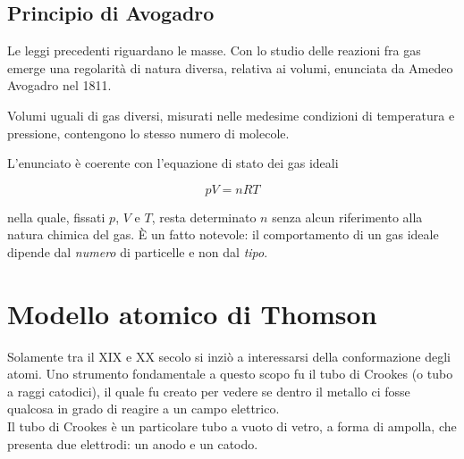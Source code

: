 \subsection{Principio di Avogadro}
 
Le leggi precedenti riguardano le masse. Con lo studio delle reazioni fra gas emerge una regolarità di natura diversa, relativa ai volumi, enunciata da Amedeo Avogadro nel 1811.
 
\begin{definizione}
    Volumi uguali di gas diversi, misurati nelle medesime condizioni di  temperatura e pressione, contengono lo stesso numero di molecole.
\end{definizione}
 
L'enunciato è coerente con l'equazione di stato dei gas ideali

\begin{equation}
    pV = nRT
    \label{eq:gasideali}
\end{equation}

nella quale, fissati $p$, $V$ e $T$, resta determinato $n$ senza alcun riferimento alla natura chimica del gas. 
È un fatto notevole: il comportamento di un gas ideale dipende dal \emph{numero} di particelle e non dal \emph{tipo}.

\newpage

\section{Modello atomico di Thomson}

Solamente tra il XIX e XX secolo si inziò a interessarsi della conformazione degli atomi. Uno strumento fondamentale a questo scopo fu il tubo di Crookes (o tubo a raggi catodici), il quale fu creato per vedere se dentro il metallo ci fosse qualcosa in grado di reagire a un campo elettrico. \\

Il tubo di Crookes è un particolare tubo a vuoto di vetro, a forma di ampolla, che presenta due elettrodi: un anodo e un catodo.\\


